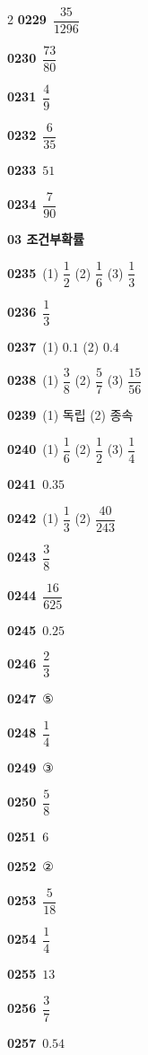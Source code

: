 \documentclass[10pt,a4paper]{article}
\begin{document}
\begin{multicols}{2}
\noindent\textbf{0229}\ $\dfrac{35}{1296}$\par
\noindent\textbf{0230}\ $\dfrac{73}{80}$\par
\noindent\textbf{0231}\ $\dfrac{4}{9}$\par
\noindent\textbf{0232}\ $\dfrac{6}{35}$\par
\noindent\textbf{0233}\ $51$\par
\noindent\textbf{0234}\ $\dfrac{7}{90}$\par
\noindent\textbf{03 조건부확률}\par\smallskip
\noindent\textbf{0235}\ (1) $\dfrac{1}{2}$ \quad (2) $\dfrac{1}{6}$ \quad (3) $\dfrac{1}{3}$\par
\noindent\textbf{0236}\ $\dfrac{1}{3}$\par
\noindent\textbf{0237}\ (1) $0.1$ \quad (2) $0.4$\par
\noindent\textbf{0238}\ (1) $\dfrac{3}{8}$ \quad (2) $\dfrac{5}{7}$ \quad (3) $\dfrac{15}{56}$\par
\noindent\textbf{0239}\ (1) 독립 \quad (2) 종속\par
\noindent\textbf{0240}\ (1) $\dfrac{1}{6}$ \quad (2) $\dfrac{1}{2}$ \quad (3) $\dfrac{1}{4}$\par
\noindent\textbf{0241}\ $0.35$\par
\noindent\textbf{0242}\ (1) $\dfrac{1}{3}$ \quad (2) $\dfrac{40}{243}$\par
\noindent\textbf{0243}\ $\dfrac{3}{8}$\par
\noindent\textbf{0244}\ $\dfrac{16}{625}$\par
\noindent\textbf{0245}\ $0.25$\par
\noindent\textbf{0246}\ $\dfrac{2}{3}$\par
\noindent\textbf{0247}\ ⑤\par
\noindent\textbf{0248}\ $\dfrac{1}{4}$\par
\noindent\textbf{0249}\ ③\par
\noindent\textbf{0250}\ $\dfrac{5}{8}$\par
\noindent\textbf{0251}\ $6$\par
\noindent\textbf{0252}\ ②\par
\noindent\textbf{0253}\ $\dfrac{5}{18}$\par
\noindent\textbf{0254}\ $\dfrac{1}{4}$\par
\noindent\textbf{0255}\ $13$\par
\noindent\textbf{0256}\ $\dfrac{3}{7}$\par
\noindent\textbf{0257}\ $0.54$\par

\end{multicols}
\end{document}
